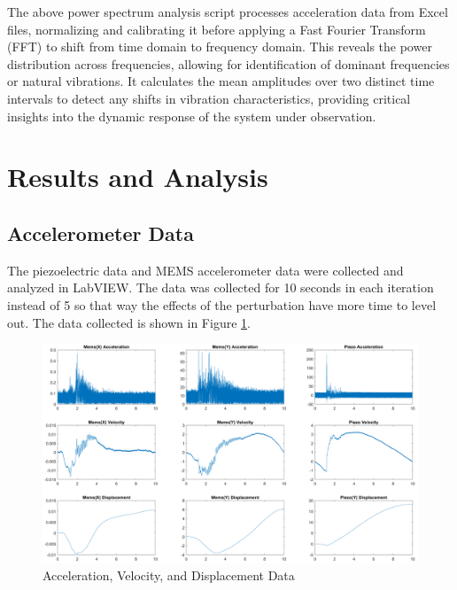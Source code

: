 \documentclass{article}
\begin{document}
The above power spectrum analysis script processes acceleration data from Excel files, normalizing and calibrating it before applying a Fast Fourier Transform (FFT) to shift from time domain to frequency domain. This reveals the power distribution across frequencies, allowing for identification of dominant frequencies or natural vibrations. It calculates the mean amplitudes over two distinct time intervals to detect any shifts in vibration characteristics, providing critical insights into the dynamic response of the system under observation.
    
\section{Results and Analysis}

\subsection{Accelerometer Data}

The piezoelectric data and MEMS accelerometer data were collected and analyzed in LabVIEW. The data was collected for 10 seconds in each iteration instead of 5 so that way the effects of the perturbation have more time to level out. The data collected is shown in Figure \ref{fig:disvelaccdata}.



\begin{figure}[H]
    \centering
    \includegraphics[width = 1\textwidth]{lab6images/disvelaccdata.png}
    \caption{Acceleration, Velocity, and Displacement Data}
    \label{fig:disvelaccdata}
\end{figure}
\end{document}
